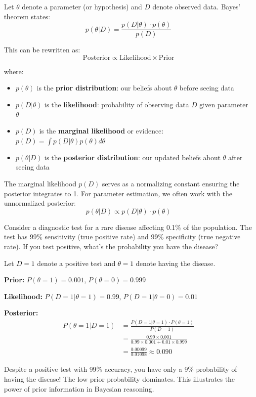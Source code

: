 \begin{theorem}
Let $\theta$ denote a parameter (or hypothesis) and $D$ denote observed data. Bayes' theorem states:
\begin{equation}
p(\theta | D) = \frac{p(D | \theta) \cdot p(\theta)}{p(D)}
\end{equation}

This can be rewritten as:
\begin{equation}
\text{Posterior} \propto \text{Likelihood} \times \text{Prior}
\end{equation}

where:
\begin{itemize}
    \item $p(\theta)$ is the \textbf{prior distribution}: our beliefs about $\theta$ before seeing data
    \item $p(D | \theta)$ is the \textbf{likelihood}: probability of observing data $D$ given parameter $\theta$
    \item $p(D)$ is the \textbf{marginal likelihood} or evidence: $p(D) = \int p(D | \theta) p(\theta) d\theta$
    \item $p(\theta | D)$ is the \textbf{posterior distribution}: our updated beliefs about $\theta$ after seeing data
\end{itemize}
\end{theorem}

The marginal likelihood $p(D)$ serves as a normalizing constant ensuring the posterior integrates to 1. For parameter estimation, we often work with the unnormalized posterior:
\begin{equation}
p(\theta | D) \propto p(D | \theta) \cdot p(\theta)
\end{equation}

\begin{example}
Consider a diagnostic test for a rare disease affecting 0.1\% of the population. The test has 99\% sensitivity (true positive rate) and 99\% specificity (true negative rate). If you test positive, what's the probability you have the disease?

Let $D = 1$ denote a positive test and $\theta = 1$ denote having the disease.

\textbf{Prior:} $P(\theta = 1) = 0.001$, $P(\theta = 0) = 0.999$

\textbf{Likelihood:} $P(D = 1 | \theta = 1) = 0.99$, $P(D = 1 | \theta = 0) = 0.01$

\textbf{Posterior:}
\begin{align}
P(\theta = 1 | D = 1) &= \frac{P(D = 1 | \theta = 1) \cdot P(\theta = 1)}{P(D = 1)} \\
&= \frac{0.99 \times 0.001}{0.99 \times 0.001 + 0.01 \times 0.999} \\
&= \frac{0.00099}{0.01098} \approx 0.090
\end{align}

Despite a positive test with 99\% accuracy, you have only a 9\% probability of having the disease! The low prior probability dominates. This illustrates the power of prior information in Bayesian reasoning.
\end{example}

